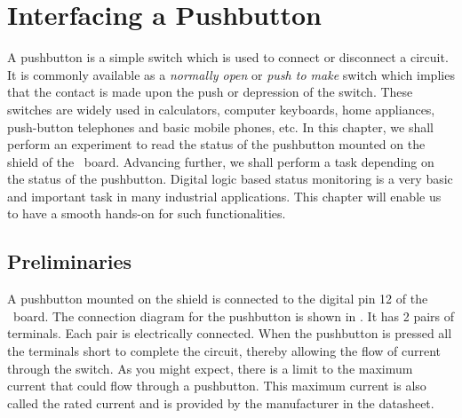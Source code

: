 \chapter{Interfacing a Pushbutton}
\thispagestyle{empty}
\label{pushbutton}

\newcommand{\LocPushfig}{\Origin/user-code/push/figures}
\newcommand{\LocPushscicode}{\Origin/user-code/push/scilab}
\newcommand{\LocPushscibrief}[1]{{\tt
    \seqsplit{Origin/user-code/push/scilab/#1}}, 
see \fnrefp{fn:file-loc}}
\newcommand{\LocPushardcode}{\Origin/user-code/push/arduino}
\newcommand{\LocPushardbrief}[1]{{\tt
    \seqsplit{Origin/user-code/push/arduino/#1}}, 
see \fnrefp{fn:file-loc}}


\newcommand{\LocPushpycode}{\Origin/user-code/push/python}
\newcommand{\LocPushpybrief}[1]{{\tt
    \seqsplit{Origin/user-code/push/python/#1}}, 
see \fnrefp{fn:file-loc}}

\newcommand{\LocPushjuliacode}{\Origin/user-code/push/julia}
\newcommand{\LocPushjuliabrief}[1]{{\tt
    \seqsplit{Origin/user-code/push/julia/#1}}, 
see \fnrefp{fn:file-loc}}


\newcommand{\LocPushOpenModelicacode}{\Origin/user-code/push/OpenModelica}  %
\newcommand{\LocPushOpenModelicabrief}[1]{{\tt \seqsplit{%
    Origin/user-code/led/OpenModelica/#1}}, see \fnrefp{fn:file-loc}} %

A pushbutton is a simple switch which is used to connect or disconnect
a circuit. It is commonly available as a \emph{normally open} or
\emph{push to make} switch which implies that the contact is made upon
the push or depression of the switch. These switches are widely used
in calculators, computer keyboards, home appliances, push-button
telephones and basic mobile phones, etc. In this chapter, we shall
perform an experiment to read the status of the pushbutton mounted
on the shield of the \arduino\ board. Advancing further, we shall
perform a task depending on the status of the pushbutton. Digital
logic based status monitoring is a very basic and important task in
many industrial applications. This chapter will enable us to have a
smooth hands-on for such functionalities. 

\section{Preliminaries}
A pushbutton mounted on the shield is connected to the digital pin 12
of the \arduino\ board. The connection diagram for the pushbutton is
shown in . It has 2 pairs of
terminals. Each pair is electrically connected. When the pushbutton is
pressed all the terminals short to complete the circuit, thereby
allowing the flow of current through the switch. As you might expect,
there is a limit to the maximum current that could flow through a
pushbutton. This maximum current is also called the rated current and
is provided by the manufacturer in the datasheet.  

